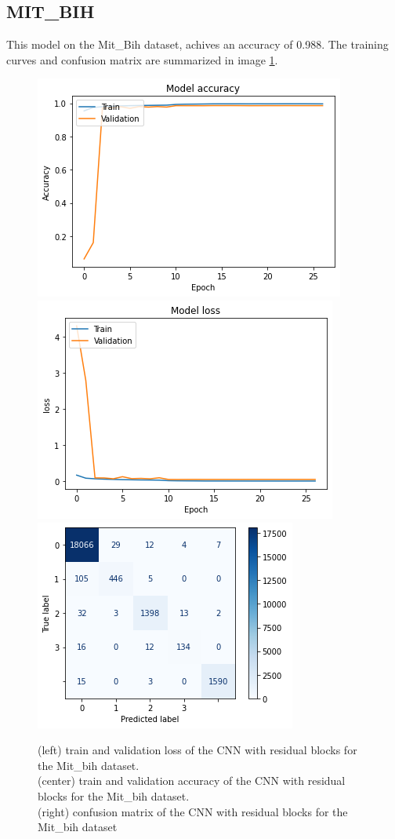 \documentclass[11pt]{scrartcl}
\begin{document}
\subsection{MIT\_BIH}
This model on the Mit\_Bih dataset, achives an accuracy of 0.988. The training curves and confusion matrix are summarized in image \ref{fig:res_mit_three}.
\begin{figure}[htp]
\centering
\includegraphics[width=.30\textwidth]{../models_performance_graphs/mit/res_net_mit_accuracy.png}\hfill
\includegraphics[width=.30\textwidth]{../models_performance_graphs/mit/res_net_mit_loss.png}\hfill
\includegraphics[width=.30\textwidth]{../models_performance_graphs/mit/res_net_mit_confusion.png}
\caption{(left) train and validation loss of the CNN with residual blocks for the Mit\_bih dataset. \\ (center) train and validation accuracy of the CNN with residual blocks for the Mit\_bih dataset. \\(right) confusion matrix of the CNN with residual blocks for the Mit\_bih dataset}
\label{fig:res_mit_three}
\end{figure}

\end{document}
